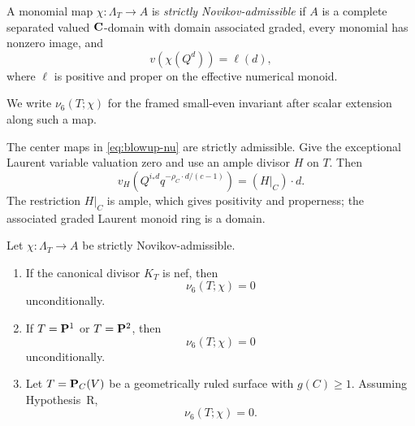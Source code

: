 \begin{definition}
\label{def:strict-novikov-admissible}
%
%
A monomial map \(\chi:\Lambda_T\to A\) is \emph{strictly
Novikov-admissible} if \(A\) is a complete separated valued \(\mathbf C\)-domain
with domain associated graded, every monomial has nonzero image, and
\[
 v(\chi(Q^d))=\ell(d),
 \label{eq:strict-novikov-valuation}
\]
where \(\ell\) is positive and proper on the effective numerical monoid.
\end{definition}

We write \(\nu_6(T;\chi)\) for the framed small-even invariant after scalar
extension along such a map.

The center maps in \eqref{eq:blowup-nu} are strictly admissible.  Give the exceptional
Laurent variable valuation zero and use an ample divisor \(H\) on \(T\).  Then
\[
 v_H\!\left(Q^{i_*d}q^{-\rho_C\cdot d/(c-1)}\right)
 =(H|_C)\cdot d.
\]
The restriction \(H|_C\) is ample, which gives positivity and properness; the
associated graded Laurent monoid ring is a domain.

\begin{proposition}
\label{prop:direct-specialized-lowdim}
%
%
Let \(\chi:\Lambda_T\to A\) be strictly Novikov-admissible.
\begin{enumerate}[label=(\roman*)]
\item If the canonical divisor \(K_T\) is nef, then
\[
  \nu_6(T;\chi)=0
\]
unconditionally.
\item If \(T=\mathbf P^1\) or \(T=\mathbf P^2\), then
\[
  \nu_6(T;\chi)=0
\]
unconditionally.
\item Let \(T=\mathbf P_C(V)\) be a geometrically ruled surface with
\(g(C)\ge1\).  Assuming Hypothesis~R,
\[
  \nu_6(T;\chi)=0.
\]
\end{enumerate}
\end{proposition}

